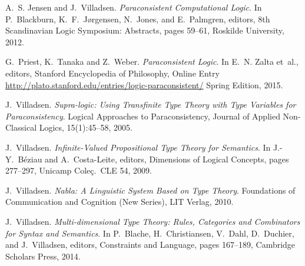 \documentclass[11pt,a4paper]{article}
\begin{document}
\clearpage{}

\begin{thebibliography}{0}

A.~S. Jensen and J.~Villadsen.
\newblock
\emph{Paraconsistent Computational Logic}.
\newblock
In P.~Blackburn, K.~F.~J{\o}rgensen, N.~Jones, and E.~Palmgren, editors, 8th Scandinavian Logic
Symposium: Abstracts, pages 59--61, Roskilde University, 2012.

G.~Priest, K.~Tanaka and Z.~Weber.
\newblock
\emph{Paraconsistent Logic}.
\newblock
In E.~N. Zalta et~al., editors, Stanford Encyclopedia of Philosophy, Online Entry
\url{http://plato.stanford.edu/entries/logic-paraconsistent/} Spring Edition, 2015.

J.~Villadsen.
\newblock
\emph{Supra-logic: Using Transfinite Type Theory with Type Variables for Paraconsistency}.
\newblock
Logical Approaches to Paraconsistency, Journal of Applied Non-Classical Logics, 15(1):45--58, 2005.

J.~Villadsen.
\newblock
\emph{Infinite-Valued Propositional Type Theory for Semantics}.
\newblock
In J.-Y.~B\'{e}ziau and A.~Costa-Leite, editors, Dimensions of Logical Concepts, pages 277--297,
Unicamp Cole\c{c}.~CLE 54, 2009.

J.~Villadsen.
\newblock
\emph{Nabla: A Linguistic System Based on Type Theory}.
\newblock
Foundations of Communication and Cognition (New Series), LIT Verlag, 2010.

J.~Villadsen.
\newblock
\emph{Multi-dimensional Type Theory: Rules, Categories and Combinators for Syntax and Semantics}.
\newblock
In P.~Blache, H.~Christiansen, V.~Dahl, D.~Duchier, and J.~Villadsen, editors, Constraints and
Language, pages 167--189, Cambridge Scholars Press, 2014.

\end{thebibliography}
\end{document}
